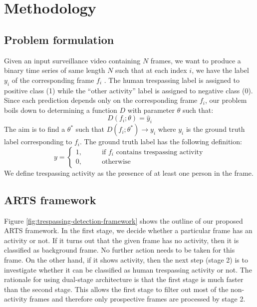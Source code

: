 \section{Methodology}
\label{sec:methodology}
\subsection{Problem formulation}
\label{sec:prob-formulation}
Given an input surveillance video containing $N$ frames, we want to produce a binary time series of same length $N$ such that at each index $i$, we have the label $y_i$ of the corresponding frame $f_i$ . The human trespassing label is assigned to positive class (1) while the ``other activity'' label is assigned to negative class (0). Since each prediction depends only on the corresponding frame $f_i$, our problem boils down to determining a function $D$ with parameter $\theta$ such that:
$$ D(f_i;\theta) = \hat{y}_i $$
The aim is to find a $\theta^*$ such that $D(f_i;\theta^*) \rightarrow y_i$ where $y_i$ is the ground truth label corresponding to $f_i$. The ground truth label has the following definition: 
$$y=
\begin{cases}
1,  &\qquad \textrm{if } f_i \textrm{ contains trespassing activity} \\ 
0, 	&\qquad \textrm{otherwise}
\end{cases}
$$
We define trespassing activity as the presence of at  least one person in the frame. 

\subsection{ARTS framework}
\label{sec:proposed-framework}
Figure \ref{fig:trespassing-detection-framework} shows the outline of our proposed ARTS framework. In the first stage, we decide whether a particular frame has an activity or not. If it turns out that the given frame has no activity, then it is classified as background frame. No further action needs to be taken for this frame. On the other hand, if it shows activity, then the next step (stage 2) is to investigate whether it can be classified as human trespassing activity or not. The rationale for using dual-stage architecture is that the first stage is much faster than the second stage. This allows the first stage to filter out most of the non-activity frames and therefore only prospective frames are processed by stage 2.


